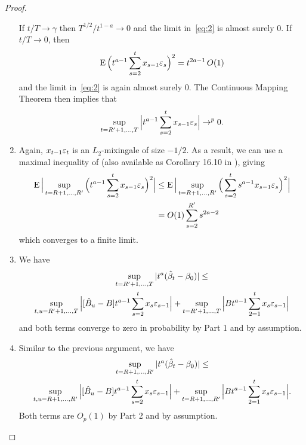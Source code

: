 \documentclass[12pt,fleqn]{article}
\begin{document}
\begin{proof}
\begin{enumerate}
    If $t/T \to \gamma$ then $T^{1/2} / t^{1-a} \to 0$ and the limit
    in~\eqref{eq:2} is almost surely 0. If $t/T \to 0$, then
    \begin{equation*}
      \operatorname{E}\Big( t^{a - 1} \sum_{s=2}^t x_{s-1} \varepsilon_s \Big)^2 = t^{2a - 1}\, O(1)
    \end{equation*}
    and the limit in~\eqref{eq:2} is again almost surely 0. The
    Continuous Mapping Theorem then implies that
    \begin{equation*}
      \sup_{t=R'+1,\dots,T} \Big| t^{a - 1} \sum_{s=2}^t x_{s-1} \varepsilon_s \Big| \to^p 0.
    \end{equation*}
  \item Again, $x_{t-1} \varepsilon_t$ is an $L_2$-mixingale of size
    $-1/2$. As a result, we can use a maximal inequality of
    \cite{Mcl:75} (also available as Corollary 16.10 in
    \citealp{Dav:94}), giving
    \begin{align*}
      \operatorname{E} \Big\lvert \sup_{t=R+1,\dots,R'} \Big(t^{a - 1} \sum_{s=2}^t x_{s-1} \varepsilon_s\Big)^2 \Big\rvert
      &\leq \operatorname{E} \Big\lvert \sup_{t=R+1,\dots,R'} \Big(\sum_{s=2}^t s^{a-1} x_{s-1} \varepsilon_s\Big)^2 \Big\rvert \\
      &= O(1) \sum_{s=2}^{R'} s^{2a - 2}
    \end{align*}
    which converges to a finite limit.
  \item We have
    \begin{multline*}
      \sup_{t=R'+1,\dots,T} | t^a (\hat{\beta}_t - \btrue) | \leq \\
      \sup_{t,u =R'+1,\dots,T} \Big| [ \hat{B}_u - B]
      t^{a-1} \sum_{s=2}^t x_s \ep_{s-1} \Big| + \sup_{t = R'+1,\dots,T} \Big|
      B t^{a-1} \sum_{2=1}^t x_s \ep_{s-1} \Big|
    \end{multline*}
    and both terms converge to zero in probability by Part 1 and by
    assumption.
  \item Similar to the previous argument, we have
    \begin{multline*}
      \sup_{t=R+1,\dots,R'} | t^a (\hat{\beta}_t - \btrue) | \leq \\
      \sup_{t,u =R+1,\dots,R'} \Big| [ \hat{B}_u - B]
      t^{a-1} \sum_{s=2}^t x_s \ep_{s-1} \Big| + \sup_{t = R+1,\dots,R'} \Big|
      B t^{a-1} \sum_{2=1}^t x_s \ep_{s-1} \Big|.
    \end{multline*}
    Both terms are $O_p(1)$ by Part 2 and by assumption. \qedhere
  \end{enumerate}
\end{proof}
\end{document}
